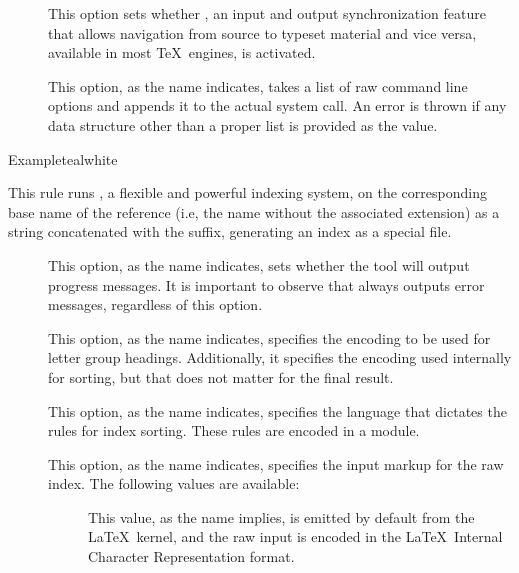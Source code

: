 \begin{description}
\begin{description}
\item[] This option sets whether , an input and output synchronization feature that allows navigation from source to typeset material and vice versa, available in most \TeX\ engines, is activated.

\item[] This option, as the name indicates, takes a list of raw command line options and appends it to the actual system call. An error is thrown if any data structure other than a proper list is provided as the value.
\end{description}

\begin{codebox}{Example}{teal}{\icnote}{white}
\end{codebox}

\item[\rulebox{xindy}{Nicola Talbot, Paulo Cereda}] This rule runs , a flexible and powerful indexing system, on the corresponding base name of the  reference (i.e, the name without the associated extension) as a string concatenated with the  suffix, generating an index as a special  file.

\begin{description}
\item[] This option, as the name indicates, sets whether the tool will output progress messages. It is important to observe that  always outputs error messages, regardless of this option.

\item[] This option, as the name indicates, specifies the encoding to be used for letter group headings. Additionally, it specifies the encoding used internally for sorting, but that does not matter for the final result.

\item[] This option, as the name indicates, specifies the language that dictates the rules for index sorting. These rules are encoded in a module.

\item[] This option, as the name indicates, specifies the input markup for the raw index. The following values are available:

\begin{description}
\item[] This value, as the name implies, is emitted by default from the \LaTeX\ kernel, and the raw input is encoded in the \LaTeX\ Internal Character Representation format.


\end{description}
\end{description}
\end{description}
